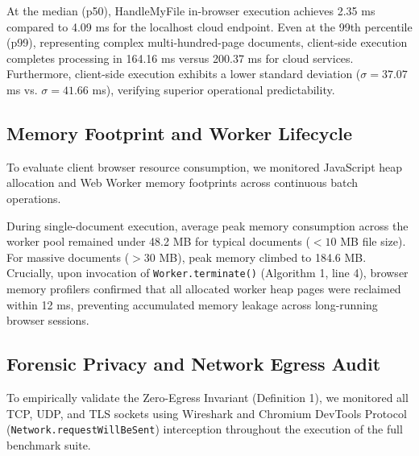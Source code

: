 \documentclass[journal]{IEEEtran}
\begin{document}
At the median (p50), HandleMyFile in-browser execution achieves 2.35 ms compared to 4.09 ms for the localhost cloud endpoint. Even at the 99th percentile (p99), representing complex multi-hundred-page documents, client-side execution completes processing in 164.16 ms versus 200.37 ms for cloud services. Furthermore, client-side execution exhibits a lower standard deviation ($\sigma = 37.07$ ms vs. $\sigma = 41.66$ ms), verifying superior operational predictability.

\subsection{Memory Footprint and Worker Lifecycle}
To evaluate client browser resource consumption, we monitored JavaScript heap allocation and Web Worker memory footprints across continuous batch operations. 

During single-document execution, average peak memory consumption across the worker pool remained under 48.2 MB for typical documents ($< 10$ MB file size). For massive documents ($> 30$ MB), peak memory climbed to 184.6 MB. Crucially, upon invocation of \texttt{Worker.terminate()} (Algorithm 1, line 4), browser memory profilers confirmed that all allocated worker heap pages were reclaimed within 12 ms, preventing accumulated memory leakage across long-running browser sessions.

\subsection{Forensic Privacy and Network Egress Audit}
To empirically validate the Zero-Egress Invariant (Definition 1), we monitored all TCP, UDP, and TLS sockets using Wireshark and Chromium DevTools Protocol (\texttt{Network.requestWillBeSent}) interception throughout the execution of the full benchmark suite.

\begin{table}[!t]
\centering
\caption{Empirical Network Egress and Metadata Sanitization Audit}
\label{tab_privacy}
\end{table}
\end{document}
